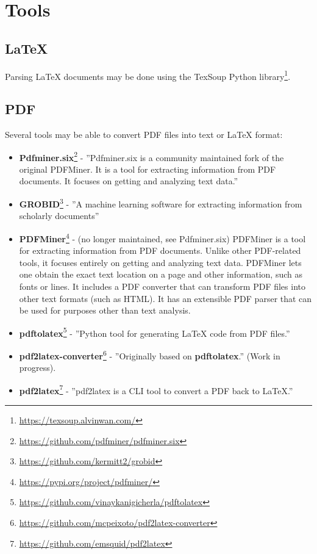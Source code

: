 \section{Tools}

\subsection{\LaTeX{}}
Parsing \LaTeX{} documents may be done using the TexSoup Python library\footnote{\url{https://texsoup.alvinwan.com/}}.

\subsection{PDF}
Several tools may be able to convert PDF files into text or \LaTeX{} format: 

\begin{itemize}
    \item \textbf{Pdfminer.six}\footnote{\url{https://github.com/pdfminer/pdfminer.six}} - ''Pdfminer.six is a community maintained fork of the original PDFMiner. It is a tool for extracting information from PDF documents. It focuses on getting and analyzing text data.''
    \item \textbf{GROBID}\footnote{\url{https://github.com/kermitt2/grobid}} - ''A machine learning software for extracting information from scholarly documents''
    \item \textbf{PDFMiner}\footnote{\url{https://pypi.org/project/pdfminer/}} - (no longer maintained, see Pdfminer.six) PDFMiner is a tool for extracting information from PDF documents. Unlike other PDF-related tools, it focuses entirely on getting and analyzing text data. PDFMiner lets one obtain the exact text location on a page and other information, such as fonts or lines. It includes a PDF converter that can transform PDF files into other text formats (such as HTML). It has an extensible PDF parser that can be used for purposes other than text analysis.
    \item \textbf{pdftolatex}\footnote{\url{https://github.com/vinaykanigicherla/pdftolatex}} - ''Python tool for generating \LaTeX{} code from PDF files.''
    \item \textbf{pdf2latex-converter}\footnote{\url{https://github.com/mcpeixoto/pdf2latex-converter}} - ''Originally based on \textbf{pdftolatex}.'' (Work in progress).
    \item \textbf{pdf2latex}\footnote{\url{https://github.com/emsquid/pdf2latex}} - ''pdf2latex is a CLI tool to convert a PDF back to LaTeX.''

\end{itemize}
